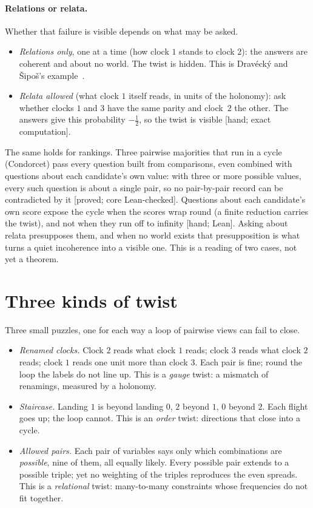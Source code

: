 \documentclass[11pt]{article}
\newcommand{\st}[1]{\textsf{\small[#1]}}
\begin{document}
\paragraph{Relations or relata.} Whether that failure is visible depends on what
may be asked.
\begin{itemize}[nosep]
  \item \emph{Relations only}, one at a time (how clock $1$ stands to clock $2$):
    the answers are coherent and about no world. The twist is hidden. This is
    Drav\'eck\'y and \v{S}ipo\v{s}'s example~\cite{draveckysipos1980}.
  \item \emph{Relata allowed} (what clock $1$ itself reads, in units of the
    holonomy): ask whether clocks $1$ and $3$ have the same parity and clock~$2$
    the other. The answers give this probability $-\tfrac12$, so the twist is
    visible \st{hand; exact computation}.
\end{itemize}
The same holds for rankings. Three pairwise majorities that run in a cycle
(Condorcet) pass every question built from comparisons, even combined with
questions about each candidate's own value: with three or more possible values,
every such question is about a single pair, so no pair-by-pair record can be
contradicted by it \st{proved; core Lean-checked}. Questions about
each candidate's own score expose the cycle when the scores wrap round
(a finite reduction carries the twist), and not when they run off to infinity
\st{hand; Lean}. Asking about relata presupposes them, and when no world exists
that presupposition is what turns a quiet incoherence into a visible one. This
is a reading of two cases, not yet a theorem.

\section{Three kinds of twist}\label{sec:kinds}
Three small puzzles, one for each way a loop of pairwise views can fail to close.

\begin{itemize}[nosep]
  \item \emph{Renamed clocks.} Clock $2$ reads what clock $1$ reads; clock $3$
    reads what clock $2$ reads; clock $1$ reads one unit more than clock $3$.
    Each pair is fine; round the loop the labels do not line up. This is a
    \emph{gauge} twist: a mismatch of renamings, measured by a holonomy.
  \item \emph{Staircase.} Landing $1$ is beyond landing $0$, $2$ beyond $1$, $0$
    beyond $2$. Each flight goes up; the loop cannot. This is an \emph{order}
    twist: directions that close into a cycle.
  \item \emph{Allowed pairs.} Each pair of variables says only which
    combinations are \emph{possible}, nine of them, all equally likely. Every
    possible pair extends to a possible triple; yet no weighting of the triples
    reproduces the even spreads. This is a \emph{relational} twist: many-to-many
    constraints whose frequencies do not fit together.
\end{itemize}
\end{document}
